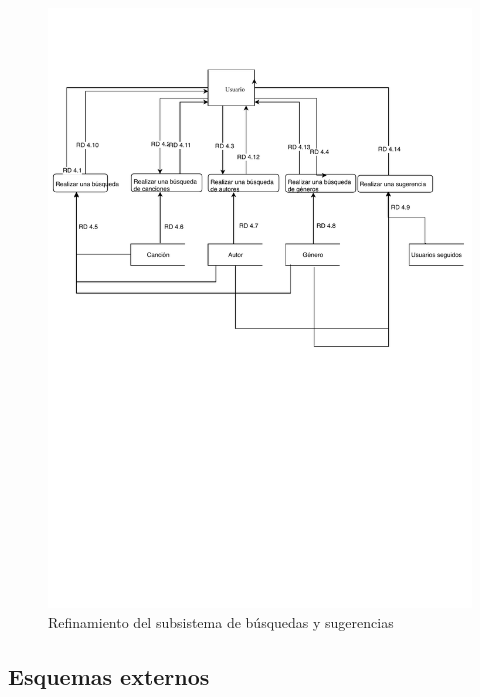 \begin{figure}[H]
  \caption{Refinamiento del subsistema de búsquedas y sugerencias}
  \includegraphics[scale=0.85]{diagramas/busqueda_refinamiento.pdf}
\end{figure}

\subsection{Esquemas externos}


